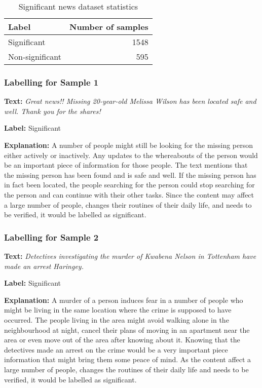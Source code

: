 \begin{table}[h]
\begin{center}
\caption{Significant news dataset statistics}
\label{tbl:dataset_statistics}
\begin{tabular}{lr}
\toprule 
Label&Number of samples\\
\midrule 
Significant&1548\\
Non-significant&595\\
\bottomrule
\end{tabular}
\end{center}
\end{table}

\subsubsection{Labelling for Sample 1}
\textbf{Text:}
\textit{Great news!! Missing 20-year-old Melissa Wilson has been located safe and well. Thank you for the shares!}\par
\textbf{Label:} Significant\par
\textbf{Explanation:} A number of people might still be looking for the missing person either actively or inactively. Any updates to the whereabouts of the person would be an important piece of information for those people. The text mentions that the missing person has been found and is safe and well. If the missing person has in fact been located, the people searching for the person could stop searching for the person and can continue with their other tasks. Since the content may affect a large number of people, changes their routines of their daily life, and needs to be verified, it would be labelled as significant.

\subsubsection{Labelling for Sample 2}
\textbf{Text:}
\textit{Detectives investigating the murder of Kwabena Nelson in Tottenham have made an arrest Haringey.}\par
\textbf{Label:} Significant\par
\textbf{Explanation:} A murder of a person induces fear in a number of people who might be living in the same location where the crime is supposed to have occurred. The people living in the area might avoid walking alone in the neighbourhood at night, cancel their plans of moving in an apartment near the area or even move out of the area after knowing about it. Knowing that the detectives made an arrest on the crime would be a very important piece information that might bring them some peace of mind. As the content affect a large number of people, changes the routines of their daily life and needs to be verified, it would be labelled as significant.

